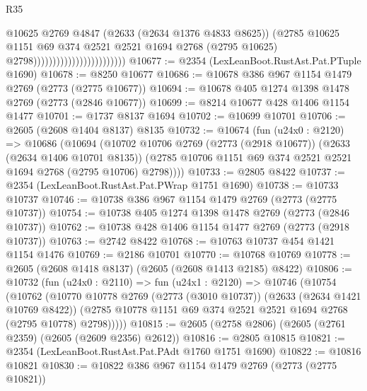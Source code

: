 \begin{lexlean}{R35}
\begin{coremodule}
                                                  @10625
                                                  @2769
                                                  @4847
                                                  (@2633 (@2634 @1376 @4833 @8625))
                                                  (@2785
                                                    @10625
                                                    @1151
                                                    @69
                                                    @374
                                                    @2521
                                                    @2521
                                                    @1694
                                                    @2768
                                                    (@2795 @10625)
                                                    @2798))))))))))))))))))))))))
@10677 := @2354 (LexLeanBoot.RustAst.Pat.PTuple @1690)
@10678 := @8250 @10677
@10686 := @10678 @386 @967 @1154 @1479 @2769 (@2773 (@2775 @10677))
@10694 := @10678 @405 @1274 @1398 @1478 @2769 (@2773 (@2846 @10677))
@10699 := @8214 @10677 @428 @1406 @1154 @1477
@10701 := @1737 @8137 @1694
@10702 := @10699 @10701
@10706 := @2605 (@2608 @1404 @8137) @8135
@10732 := @10674
    (fun (u24x0 : @2120) =>
    @10686
      (@10694
        (@10702
          @10706
          @2769
          (@2773 (@2918 @10677))
          (@2633 (@2634 @1406 @10701 @8135))
          (@2785 @10706 @1151 @69 @374 @2521 @2521 @1694 @2768 (@2795 @10706) @2798))))
@10733 := @2805 @8422
@10737 := @2354 (LexLeanBoot.RustAst.Pat.PWrap @1751 @1690)
@10738 := @10733 @10737
@10746 := @10738 @386 @967 @1154 @1479 @2769 (@2773 (@2775 @10737))
@10754 := @10738 @405 @1274 @1398 @1478 @2769 (@2773 (@2846 @10737))
@10762 := @10738 @428 @1406 @1154 @1477 @2769 (@2773 (@2918 @10737))
@10763 := @2742 @8422
@10768 := @10763 @10737 @454 @1421 @1154 @1476
@10769 := @2186 @10701
@10770 := @10768 @10769
@10778 := @2605 (@2608 @1418 @8137) (@2605 (@2608 @1413 @2185) @8422)
@10806 := @10732
    (fun (u24x0 : @2110) =>
    fun (u24x1 : @2120) =>
    @10746
      (@10754
        (@10762
          (@10770
            @10778
            @2769
            (@2773 (@3010 @10737))
            (@2633 (@2634 @1421 @10769 @8422))
            (@2785 @10778 @1151 @69 @374 @2521 @2521 @1694 @2768 (@2795 @10778) @2798)))))
@10815 := @2605 (@2758 @2806) (@2605 (@2761 @2359) (@2605 (@2609 @2356) @2612))
@10816 := @2805 @10815
@10821 := @2354 (LexLeanBoot.RustAst.Pat.PAdt @1760 @1751 @1690)
@10822 := @10816 @10821
@10830 := @10822 @386 @967 @1154 @1479 @2769 (@2773 (@2775 @10821))

\end{coremodule}
\end{lexlean}
